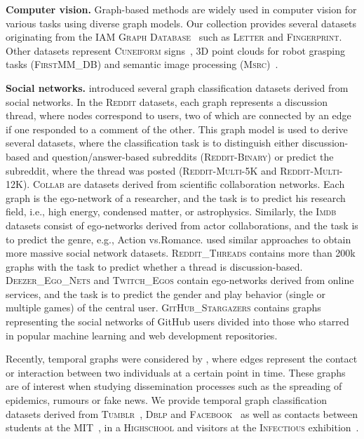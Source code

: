 \documentclass{article}
\newcommand{\xhdr}[1]{{\noindent\bfseries #1}}
\theoremstyle{definition}
\begin{document}
\xhdr{Computer vision.}
Graph-based methods are widely used in computer vision for various tasks using diverse graph models. Our collection provides several datasets originating from the \textsc{IAM Graph Database}~\citep{Riesen2008} such as \textsc{Letter} and \textsc{Fingerprint}. Other datasets represent \textsc{Cuneiform} signs~\citep{Kriege2018}, 3D point clouds for robot grasping tasks (\textsc{FirstMM\_DB}) and semantic image processing (\textsc{Msrc})~\cite{Neu+2016}.

\xhdr{Social networks.}
\citet{Yan+2015a} introduced several graph classification datasets derived from social networks. In the \textsc{Reddit} datasets, each graph represents a discussion thread, where nodes correspond to users, two of which are connected by an edge if one responded to a comment of the other. This graph model is used to derive several datasets, where the classification task is to distinguish either discussion-based and question/answer-based subreddits (\textsc{Reddit-Binary}) or predict the subreddit, where the thread was posted (\textsc{Reddit-Multi-5K} and \textsc{Reddit-Multi-12K}). \textsc{Collab} are datasets derived from scientific collaboration networks. Each graph is the ego-network of a researcher, and the task is to predict his research field, i.e., high energy, condensed matter, or astrophysics. Similarly, the \textsc{Imdb} datasets consist of ego-networks derived from actor collaborations, and the task is to predict the genre, e.g.,  Action vs.\@ Romance.
\citet{Rozemberczki2020} used similar approaches to obtain more massive social network datasets. \textsc{Reddit\_Threads} contains more than 200k graphs with the task to predict whether a thread is discussion-based. \textsc{Deezer\_Ego\_Nets} and \textsc{Twitch\_Egos} contain ego-networks derived from online services, and the task is to predict the gender and play behavior (single or multiple games) of the central user.
\textsc{GitHub\_Stargazers} contains graphs representing the social networks of GitHub users divided into those who starred in popular machine learning and web development repositories.


Recently, temporal graphs were considered by \citet{Oettershagen2019}, where edges represent the contact or interaction between two individuals at a certain point in time. These graphs are of interest when studying dissemination processes such as the spreading of epidemics, rumours or fake news. We provide temporal graph classification datasets derived from \textsc{Tumblr}~\citep{rozenshtein2016reconstructing}, \textsc{Dblp} and \textsc{Facebook}~\citep{viswanath2009evolution} as well as contacts between students at the \textsc{MIT}~\cite{konect:eagle06}, in a \textsc{Highschool} and visitors at the \textsc{Infectious} exhibition~\citep{Isella2011}.
\end{document}
